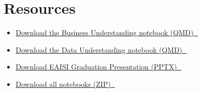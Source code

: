 \documentclass[
  american,
  10,
  a4paper,
]{book}
\providecommand{\tightlist}{%
  \setlength{\itemsep}{0pt}\setlength{\parskip}{0pt}}
\theoremstyle{definition}
\theoremstyle{remark}
\begin{document}
\chapter{Resources}\label{sec-19-resources}

\begin{itemize}
\tightlist
\item
  \href{../notebooks/01_business_understanding.qmd}{Download the
  Business Understanding notebook (QMD) 💾}
\item
  \href{../notebooks/02_data_understanding.qmd}{Download the Data
  Understanding notebook (QMD) 💾}
\item
  \href{../pptx/PAF+s03.pptx}{Download EAISI Graduation Presentation
  (PPTX) 💾}
\item
  \href{notebooks.zip}{Download all notebooks (ZIP) 💾}
\end{itemize}


\backmatter
\end{document}
